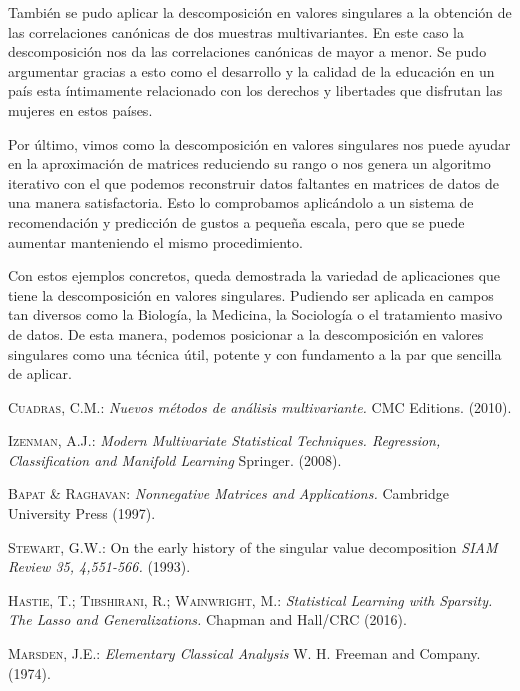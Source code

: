 \documentclass[tfg,cienciasbased,lot,lof,covers,final,overleaf,nocopyright]{tfgtfmthesisuam}
\begin{document}
También se pudo aplicar la descomposición en valores singulares a la obtención de las correlaciones canónicas de dos muestras multivariantes. En este caso la descomposición nos da las correlaciones canónicas de mayor a menor. Se pudo argumentar gracias a esto como el desarrollo y la calidad de la educación en un país esta íntimamente relacionado con los derechos y libertades que disfrutan las mujeres en estos países.

Por último, vimos como la descomposición en valores singulares nos puede ayudar en la aproximación de matrices reduciendo su rango o nos genera un algoritmo iterativo con el que podemos reconstruir datos faltantes en matrices de datos de una manera satisfactoria. Esto lo comprobamos aplicándolo a un sistema de recomendación y predicción de gustos a pequeña escala, pero que se puede aumentar manteniendo el mismo procedimiento.

Con estos ejemplos concretos, queda demostrada la variedad de aplicaciones que tiene la descomposición en valores singulares. Pudiendo ser aplicada en campos tan diversos como la Biología, la Medicina, la Sociología o el tratamiento masivo de datos. De esta manera, podemos posicionar a la descomposición en valores singulares como una técnica útil, potente y con fundamento a la par que sencilla de aplicar.


\begin{thebibliography}{10}
    
    \textsc{Cuadras, C.M.}: 
    \textit{Nuevos métodos de análisis multivariante.} 
    CMC Editions. (2010).
    
    \textsc{Izenman, A.J.}: 
    \textit{Modern Multivariate Statistical Techniques. Regression, Classification and Manifold Learning} 
    Springer. (2008).
    
    \textsc{Bapat \& Raghavan}: 
    \textit{Nonnegative Matrices and Applications.}
    Cambridge University Press (1997).
    
    \textsc{Stewart, G.W.}: 
    On the early history of the singular value decomposition
    \textit{SIAM Review 35, 4,551-566.} (1993).
    
    \textsc{Hastie, T.; Tibshirani, R.; Wainwright, M.}: 
    \textit{Statistical Learning with Sparsity. The Lasso and Generalizations.}
    Chapman and Hall/CRC (2016).
    
    \textsc{Marsden, J.E.}: 
    \textit{Elementary Classical Analysis} 
    W. H. Freeman and Company. (1974).

\end{thebibliography}
\end{document}

